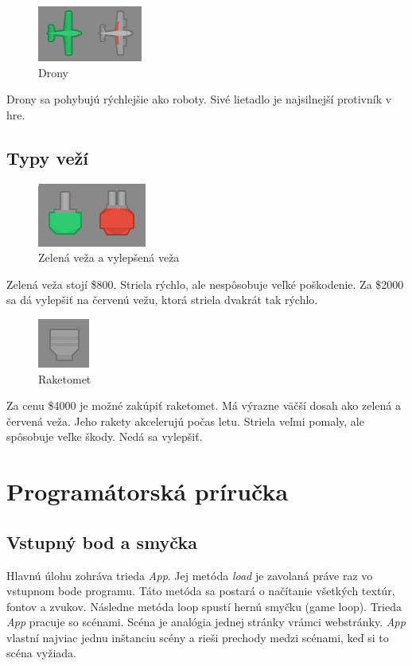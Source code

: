 \documentclass[12pt]{article}
\begin{document}
\begin{figure}[h]
    \centering
    \includegraphics{images/lietadlo.png}
    \caption{Drony}
\end{figure}
Drony sa pohybujú rýchlejšie ako roboty. Sivé lietadlo je najsilnejší protivník v hre.

\subsection{Typy veží}

\begin{figure}[h]
    \centering
    \includegraphics{images/veze.png}
    \caption{Zelená veža a vylepšená veža}
\end{figure}

Zelená veža stojí \$800. Striela rýchlo, ale nespôsobuje veľké poškodenie. Za \$2000
sa dá vylepšiť na červenú vežu, ktorá striela dvakrát tak rýchlo.

\begin{figure}[h]
    \centering
    \includegraphics{images/raketomet.png}
    \caption{Raketomet}
\end{figure}

Za cenu \$4000 je možné zakúpiť raketomet. Má výrazne väčší dosah ako zelená a červená veža.
Jeho rakety akcelerujú počas letu. Striela veľmi pomaly, ale spôsobuje veľke škody.
Nedá sa vylepšiť.

\section{Programátorská príručka}

\subsection{Vstupný bod a smyčka}
Hlavnú úlohu zohráva trieda \emph{App}. Jej metóda \emph{load} je zavolaná práve raz vo vstupnom
bode programu. Táto metóda sa postará o načítanie všetkých textúr, fontov a zvukov.
Následne metóda loop spustí hernú smyčku (game loop). Trieda \emph{App} pracuje so scénami.
Scéna je analógia jednej stránky vrámci webstránky. \emph{App} vlastní najviac jednu inštanciu
scény a rieši prechody medzi scénami, keď si to scéna vyžiada.
\end{document}
